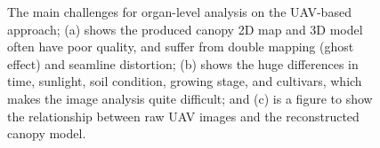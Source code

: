 \begin{figure}[htb]
  \begin{center}
  \end{center}
  \caption[Organ-level analysis challenges of UAV-based approach]{
    The main challenges for organ-level analysis on the UAV-based approach; (a) shows the produced canopy 2D map and 3D model often have poor quality, and suffer from double mapping (ghost effect) and seamline distortion; (b) shows the huge differences in time, sunlight, soil condition, growing stage, and cultivars, which makes the image analysis quite difficult; and (c) is a figure to show the relationship between raw UAV images and the reconstructed canopy model.
  }
  \label{fig:idp1}
\end{figure}